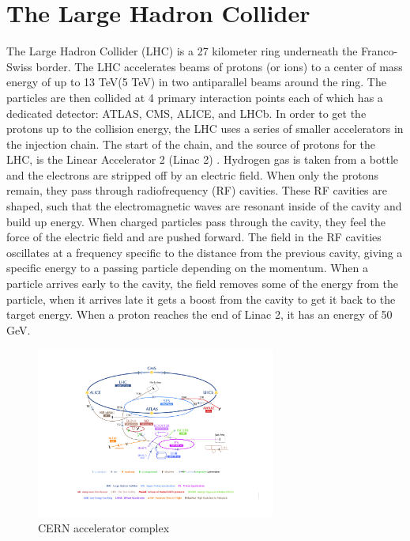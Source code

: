 \section{The Large Hadron Collider}
The Large Hadron Collider (LHC) is a 27 kilometer ring underneath the Franco-Swiss border. The LHC accelerates beams of protons (or ions) to a center of mass energy of up to 13 TeV(5 TeV) in two antiparallel beams around the ring. The particles are then collided at 4 primary interaction points each of which has a dedicated detector: ATLAS, CMS, ALICE, and LHCb.\linebreak
\indent In order to get the protons up to the collision energy, the LHC uses a series of smaller accelerators in the injection chain. The start of the chain, and the source of protons for the LHC, is the Linear Accelerator 2 (Linac 2) \cite{accelerator:1997427}. Hydrogen gas is taken from a bottle and the electrons are stripped off by an electric field. When only the protons remain, they pass through radiofrequency (RF) cavities. These RF cavities are shaped, such that the electromagnetic waves are resonant inside of the cavity and build up energy. When charged particles pass through the cavity, they feel the force of the electric field and are pushed forward. The field in the RF cavities oscillates at a frequency specific to the distance from the previous cavity, giving a specific energy to a passing particle depending on the momentum. When a particle arrives early to the cavity, the field removes some of the energy from the particle, when it arrives late it gets a boost from the cavity to get it back to the target energy. When a proton reaches the end of Linac 2, it has an energy of 50 GeV.\linebreak

\begin{figure}[h]
\begin{center}
\includegraphics*[width=0.70\textwidth] {figures/CERN_Accelerator_Complex}%
\caption[CERN accelerator complex \cite{DeMelis:2119882}]{CERN accelerator complex \cite{DeMelis:2119882}}
\label{fig:CERN_ACC}
\end{center}
\end{figure}


